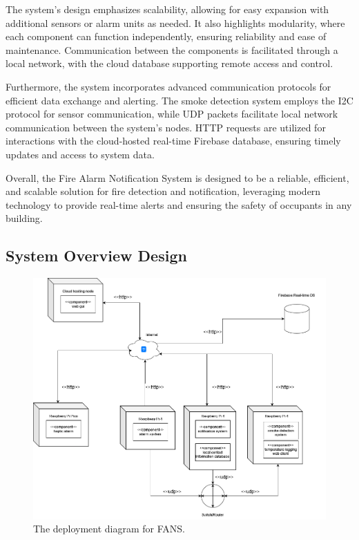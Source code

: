 The system's design emphasizes scalability, allowing for easy expansion with additional sensors or alarm units as
needed. It also highlights modularity, where each component can function independently, ensuring reliability and ease
of maintenance. Communication between the components is facilitated through a local network, with the cloud database
supporting remote access and control.

Furthermore, the system incorporates advanced communication protocols for efficient data exchange and alerting. The
smoke detection system employs the I2C protocol for sensor communication, while UDP packets facilitate local network
communication between the system's nodes. HTTP requests are utilized for interactions with the cloud-hosted real-time
Firebase database, ensuring timely updates and access to system data.

Overall, the Fire Alarm Notification System is designed to be a reliable, efficient, and scalable solution for fire
detection and notification, leveraging modern technology to provide real-time alerts and ensuring the safety of
occupants in any building.

\subsection{System Overview Design}

\begin{figure}[H]
    \centering
    \includegraphics[width=\linewidth]{../assets/FANSDeployment.png}
    \caption{The deployment diagram for FANS.}
    \label{fig:deployment}
\end{figure}

